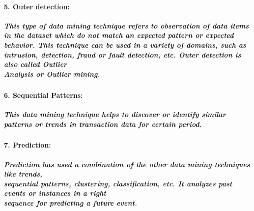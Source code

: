 \documentclass{article}
\begin{document}
\paragraph*{5. Outer detection:}
\subparagraph{This type of data mining technique refers to observation of data items in the dataset which do not match an expected pattern or expected behavior. This technique can be used in a variety of domains, such as intrusion, detection, fraud or fault detection, etc. Outer detection is also called Outlier\\Analysis or Outlier mining.}
\paragraph*{6. Sequential Patterns:}
\subparagraph{This data mining technique helps to discover or identify similar patterns or trends in transaction data for certain period.}
\paragraph*{7. Prediction:}
\subparagraph{Prediction has used a combination of the other data mining techniques like trends,\\sequential patterns, clustering, classification, etc. It analyzes past events or instances in a right\\sequence for predicting a future event.}
\end{document}
